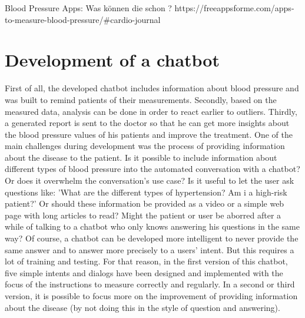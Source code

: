 Blood Pressure Apps:
Was können die schon ? 
https://freeappsforme.com/apps-to-measure-blood-pressure/#cardio-journal


\chapter{Development of a chatbot}\label{chatbot}

First of all, the developed chatbot includes information about blood pressure and was built to remind patients of their measurements. Secondly, based on the measured data, analysis can be done in order to react earlier to outliers. Thirdly, a generated report is sent to the doctor so that he can get more insights about the blood pressure values of his patients and improve the treatment.
One of the main challenges during development was the process of providing information about the disease to the patient. Is it possible to include information about different types of blood pressure into the automated conversation with a chatbot? Or does it overwhelm the conversation's use case? Is it useful to let the user ask questions like: 'What are the different types of hypertension? Am i a high-risk patient?' 
Or should these information be provided as a video or a simple web page with long articles to read? Might the patient or user be aborred after a while of talking to a chatbot who only knows answering his questions in the same way?
Of course, a chatbot can be developed more intelligent to never provide the same answer and to answer more precisely to a users' intent. But this requires a lot of training and testing. 
For that reason, in the first version of this chatbot, five simple intents and dialogs have been designed and implemented with the focus of the instructions to measure correctly and regularly. 
In a second or third version, it is possible to focus more on the improvement of providing information about the disease (by not doing this in the style of question and answering).

